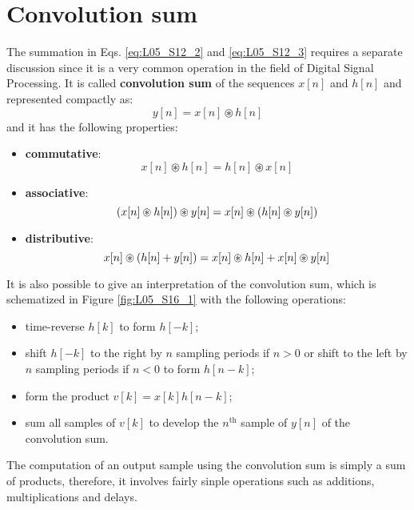 \documentclass[../../main/main.tex]{subfiles}
\begin{document}
\section{Convolution sum}
The summation in Eqs. \ref{eq:L05_S12_2} and \ref{eq:L05_S12_3} requires a separate discussion since it is a very common operation in the field of Digital Signal Processing.
It is called \textbf{convolution sum} of the sequences \( x[n] \) and \( h[n] \) and represented compactly as:
\begin{equation}
    y[n]
    =
    x[n] \circledast h[n]
    \label{eq:L05_S13_2}
\end{equation}
and it has the following properties:
\begin{itemize}
    \item \textbf{commutative}:
    \begin{equation}
        x[n] \circledast h[n]
        =
        h[n] \circledast x[n]
        \label{eq:L05_S14_1}
    \end{equation}

    \item \textbf{associative}:
    \begin{equation}
        \qty(x[n] \circledast h[n]) \circledast y[n]
        =
        x[n] \circledast \qty(h[n] \circledast y[n])
        \label{eq:L05_S14_2}
    \end{equation}

    \item \textbf{distributive}:
    \begin{equation}
        x[n] \circledast \qty(h[n] + y[n])
        =
        x[n] \circledast h[n] + x[n] \circledast y[n]
        \label{eq:L05_S14_3}
    \end{equation}
\end{itemize}
It is also possible to give an interpretation of the convolution sum, which is schematized in Figure \ref{fig:L05_S16_1} with the following operations:
\begin{itemize}
    \item time-reverse \( h[k] \) to form \( h[-k] \);
    \item shift \( h[-k] \) to the right by \( n \) sampling periods if \( n > 0 \) or shift to the left by \( n \) sampling periods if \( n < 0 \) to form \( h[n-k] \);
    \item form the product \( v[k] = x[k]h[n-k] \);
    \item sum all samples of \( v[k] \) to develop the \( n^{\text{th}} \) sample of \( y[n] \) of the convolution sum.
\end{itemize}
The computation of an output sample using the convolution sum is simply a sum of products, therefore, it involves fairly sinple operations such as additions, multiplications and delays.
\end{document}
